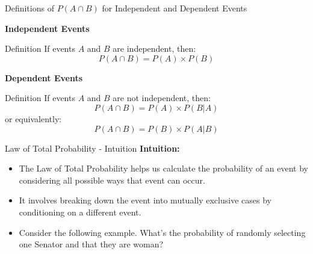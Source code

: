\documentclass[handout]{beamer} %
\begin{document}
\begin{frame}{Definitions of \(P(A \cap B)\) for Independent and Dependent Events}

    \begin{minipage}[t]{0.45\textwidth}
        \centering
        \textbf{Independent Events}\pause
        \begin{block}{Definition}
            If events \(A\) and \(B\) are independent, then:\pause
            \[
            P(A \cap B) = P(A) \times P(B)
            \]\pause
        \end{block}
    \end{minipage}
    \hfill
    \begin{minipage}[t]{0.45\textwidth}
        \centering
        \textbf{Dependent Events}\pause
        \begin{block}{Definition}
            If events \(A\) and \(B\) are not independent, then:\pause
            \[
            P(A \cap B) = P(A) \times P(B|A)
            \]\pause
            or equivalently:
            \[
            P(A \cap B) = P(B) \times P(A|B)
            \]
        \end{block}
    \end{minipage}

\end{frame}


\begin{frame}{Law of Total Probability - Intuition}
    \textbf{Intuition:} \pause
    \begin{itemize}
        \item The Law of Total Probability helps us calculate the probability of an event by considering all possible ways that event can occur.\pause
        \item It involves breaking down the event into mutually exclusive cases by conditioning on a different event.\pause
        \item Consider the following example. What's the probability of randomly selecting one Senator and that they are woman?
    \end{itemize}
\end{frame}
\end{document}
